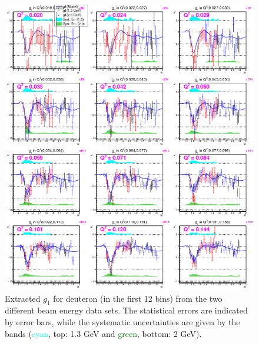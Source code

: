 \begin{figure}[H] %
  \leavevmode \includegraphics[width=1.0\textwidth]{figuresEG4/FigResults/extractedFrmBothEb_G1_C71S181NoQeWbins70LessQ2binsNwPd.png} 
  \caption[Extracted $g_{1}$ in the first 12 \qsqs bins]{Extracted $g_{1}$ for deuteron (in the first 12 \qsqs bins) from the two different beam energy data sets. The statistical errors are indicated by error bars, while the systematic uncertainties are given by the bands (\textcolor{cyan}{cyan}, top: 1.3 GeV and \textcolor{green}{green}, bottom: 2 GeV).}
  \label{extG1}  %
\end{figure}

